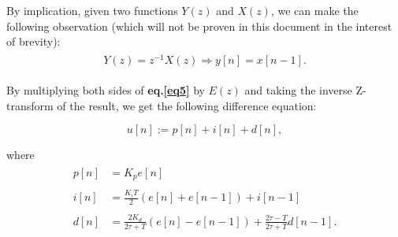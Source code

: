 \documentclass[11pt]{article}
\theoremstyle{definition}
\begin{document}
By implication, given two functions $Y(z)$ and $X(z)$, we can make the following observation (which will not be proven in this document in
the interest of brevity):
\begin{align*}
\begin{split}
    Y(z) = z^{-1}X(z) \Rightarrow y[n] = x[n-1].
\end{split}
\end{align*}

By multiplying both sides of \textbf{eq.\ref{eq5}} by $E(z)$ and taking the inverse Z-transform of the result, we get the following difference equation:

\begin{equation} \label{eq6}
\boxed{
    u[n] := p[n] + i[n] + d[n],
}
\end{equation}

where
\begin{align*}
\begin{split}
    p[n] &= K_{p}e[n] \\\\
    i[n] &= \frac{K_{i}T}{2}\left(e[n] + e[n-1]\right) + i[n-1] \\\\
    d[n] &= \frac{2K_{d}}{2\tau + T}\left(e[n] - e[n-1]\right) + \frac{2\tau - T}{2\tau + T}d[n-1].
\end{split}
\end{align*}
\end{document}
